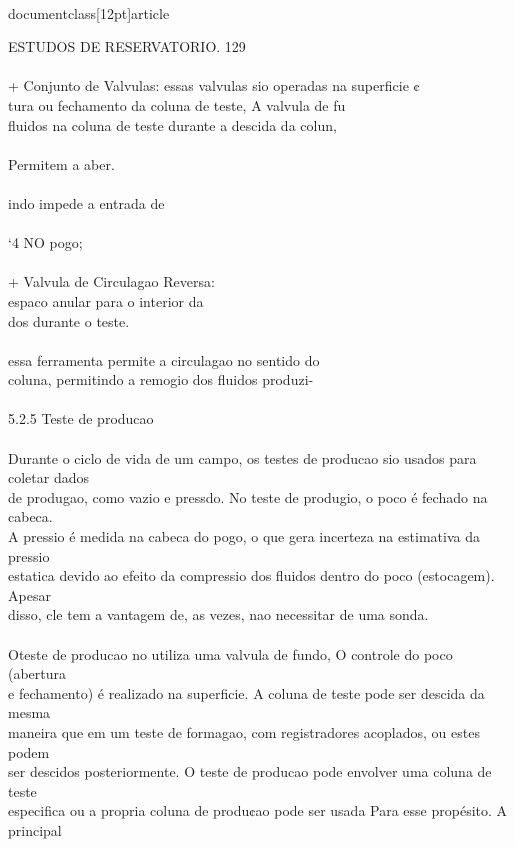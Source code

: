 \\documentclass[12pt]{article}
\begin{document}
ESTUDOS DE RESERVATORIO. 129\\
\\
+ Conjunto de Valvulas: essas valvulas sio operadas na superficie ¢\\
tura ou fechamento da coluna de teste, A valvula de fu\\
fluidos na coluna de teste durante a descida da colun,\\
\\
Permitem a aber.\\
\\
indo impede a entrada de\\
\\
‘4 NO pogo;\\
\\
+ Valvula de Circulagao Reversa:\\
espaco anular para o interior da\\
dos durante o teste.\\
\\
essa ferramenta permite a circulagao no sentido do\\
coluna, permitindo a remogio dos fluidos produzi-\\
\\
5.2.5 Teste de producao\\
\\
Durante o ciclo de vida de um campo, os testes de producao sio usados para coletar dados\\
de produgao, como vazio e pressdo. No teste de produgio, o poco é fechado na cabeca.\\
A pressio é medida na cabeca do pogo, o que gera incerteza na estimativa da pressio\\
estatica devido ao efeito da compressio dos fluidos dentro do poco (estocagem). Apesar\\
disso, cle tem a vantagem de, as vezes, nao necessitar de uma sonda.\\
\\
Oteste de producao no utiliza uma valvula de fundo, O controle do poco (abertura\\
e fechamento) é realizado na superficie. A coluna de teste pode ser descida da mesma\\
maneira que em um teste de formagao, com registradores acoplados, ou estes podem\\
ser descidos posteriormente. O teste de producao pode envolver uma coluna de teste\\
especifica ou a propria coluna de produ¢ao pode ser usada Para esse propésito. A principal\\
\end{document}
